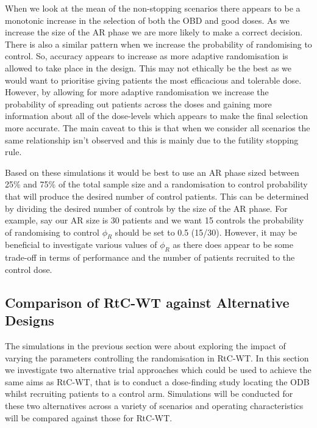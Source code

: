 When we look at the mean of the non-stopping scenarios there appears to be a monotonic increase in the selection of both the OBD and good doses. As we increase the size of the AR phase we are more likely to make a correct decision. There is also a similar pattern when we increase the probability of randomising to control. So, accuracy appears to increase as more adaptive randomisation is allowed to take place in the design. This may not ethically be the best as we would want to prioritise giving patients the most efficacious and tolerable dose. However, by allowing for more adaptive randomisation we increase the probability of spreading out patients across the doses and gaining more information about all of the dose-levels which appears to make the final selection more accurate. The main caveat to this is that when we consider all scenarios the same relationship isn't observed and this is mainly due to the futility stopping rule. 

Based on these simulations it would be best to use an AR phase sized between 25\% and 75\% of the total sample size and a randomisation to control probability that will produce the desired number of control patients. This can be determined by dividing the desired number of controls by the size of the AR phase. For example, say our AR size is 30 patients and we want 15 controls the probability of randomising to control $\phi_R$ should be set to 0.5 (15/30). However, it may be beneficial to investigate various values of $\phi_R$ as there does appear to be some trade-off in terms of performance and the number of patients recruited to the control dose.

\subsection{Comparison of RtC-WT against Alternative Designs }
\label{WT:CompAltDesigns}

The simulations in the previous section were about exploring the impact of varying the parameters controlling the randomisation in RtC-WT. In this section we investigate two alternative trial approaches which could be used to achieve the same aims as RtC-WT, that is to conduct a dose-finding study locating the ODB whilst recruiting patients to a control arm. Simulations will be conducted for these two alternatives across a variety of scenarios and operating characteristics will be compared against those for RtC-WT.       

